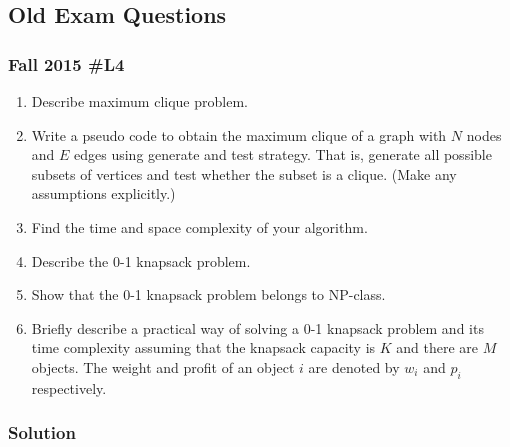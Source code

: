\subsection{Old Exam Questions}

\subsubsection{ Fall 2015 \#L4}
	
\begin{enumerate}[label=\alph*.]
	\item Describe maximum clique problem.
	\item Write a pseudo code to obtain the maximum clique of a graph with $N$ nodes and $E$ edges using generate and test strategy.  That is, generate all possible subsets of vertices and test whether the subset is a clique.  (Make any assumptions explicitly.)
	\item Find the time and space complexity of your algorithm.
	\item Describe the 0-1 knapsack problem.
	\item Show that the 0-1 knapsack problem belongs to NP-class.
	\item Briefly describe a practical way of solving a 0-1 knapsack problem and its time complexity assuming that the knapsack capacity is $K$ and there are $M$ objects.  The weight and profit of an object $i$ are denoted by $w_i$ and $p_i$ respectively.  
\end{enumerate}

\subsubsection{Solution}

